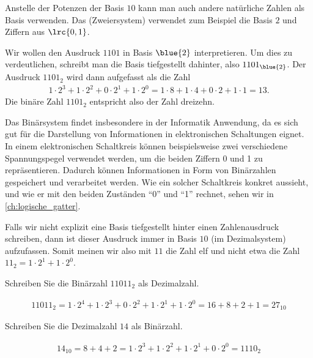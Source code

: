 Anstelle der Potenzen der Basis $10$ kann man auch andere natürliche Zahlen als Basis verwenden.
Das  (Zweiersystem) verwendet zum Beispiel die Basis $2$ und
Ziffern aus $\lrc{0,1}$.
\begin{myexample}
Wir wollen den Ausdruck $1101$ in Basis $\blue{2}$ interpretieren. Um dies zu verdeutlichen, schreibt man die Basis
tiefgestellt dahinter, also $1101_{\blue{2}}$. Der Ausdruck $1101_2$ wird dann aufgefasst als die Zahl
\begin{align*}
	1\cdot 2^3 + 1\cdot 2^2 + 0\cdot 2^1 + 1\cdot 2^0 = 1\cdot 8 + 1\cdot 4 + 0\cdot 2 + 1\cdot 1 = 13.
\end{align*}
Die binäre Zahl $1101_2$ entspricht also der Zahl dreizehn.
\end{myexample}

Das Binärsystem findet insbesondere in der Informatik Anwendung, da es sich gut für die Darstellung von Informationen in elektronischen Schaltungen eignet. In einem elektronischen Schaltkreis können beispielsweise zwei verschiedene Spannungspegel verwendet werden, um die beiden Ziffern 0 und 1 zu repräsentieren. Dadurch können Informationen in Form von Binärzahlen gespeichert und verarbeitet werden. Wie ein solcher Schaltkreis konkret aussieht, und wie er mit den beiden Zuständen \enquote{0} und \enquote{1} rechnet, sehen wir in \cref{ch:logische_gatter}.

\begin{myattention}
	Falls wir nicht explizit eine Basis tiefgestellt hinter einen Zahlenausdruck schreiben, dann ist dieser Ausdruck immer in Basis $10$ (im
	Dezimalsystem) aufzufassen. Somit meinen wir also mit $11$ die Zahl elf und nicht etwa die Zahl $11_2 = 1\cdot 2^1 +
		1\cdot 2^0$.
\end{myattention}

\begin{myexercise}
	Schreiben Sie die Binärzahl $11011_2$ als Dezimalzahl.
	\begin{myanswer}
		\begin{align*}
			11011_2 = 1\cdot 2^4 + 1\cdot 2^3 + 0\cdot 2^2 + 1\cdot 2^1 + 1\cdot 2^0 = 16 + 8 + 2 + 1 = 27_{10}
		\end{align*}
	\end{myanswer}
\end{myexercise}

\begin{myexercise}
	Schreiben Sie die Dezimalzahl $14$ als Binärzahl.
	\begin{myanswer}
		\begin{align*}
			14_{10} = 8 + 4 + 2 = 1\cdot 2^3 + 1\cdot 2^2 + 1\cdot 2^1 + 0\cdot 2^0 = 1110_2
		\end{align*}
	\end{myanswer}
\end{myexercise}

